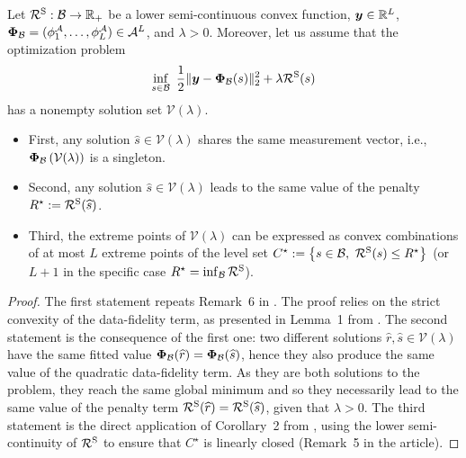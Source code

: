 \documentclass[12pt]{article}
\begin{document}
    \begin{proposition}
    \label{prop:abstract-rt}
    Let $\mathcal{R}^\mathrm{S}: \mathcal{B} \to \mathbb{R}_+$ be a lower semi-continuous convex function, $\bm{y}\in \mathbb{R}^L$, ${\bm{\Phi}_\mathcal{B}}= (\phi^\mathcal{A}_1 ,\ldots , \phi^\mathcal{A}_L) \in \mathcal{A}^L$, and $\lambda > 0$. Moreover, let us assume that the optimization problem
    \begin{equation} \label{eq:sparse-rt}
        \inf_{s \in \mathcal{B}}\ \frac{1}{2} \| \bm{y} - {\bm{\Phi}_\mathcal{B}}(s) \|_2^2 + \lambda \mathcal{R}^\mathrm{S}(s)
    \end{equation}
    has a nonempty solution set $\mathcal{V}(\lambda)$.
    \begin{itemize}
        \item First, any solution $\widehat{s} \in \mathcal{V}(\lambda)$ shares the same measurement vector, i.e., $\bm{\Phi}_\mathcal{B} \left(\mathcal{V}(\lambda)\right)$ is a singleton.
        \item Second, any solution $\widehat{s} \in \mathcal{V}(\lambda)$ leads to the same value of the penalty $R^\star := \mathcal{R}^\mathrm{S}(\widehat{s})$.
        \item Third, the extreme points of $\mathcal{V}(\lambda)$ can be expressed as convex combinations of at most $L$ extreme points of the level set $C^\star:= \left\{s \in \mathcal{B},\ \mathcal{R}^\mathrm{S}(s) \leq R^\star\right\}$ (or $L+1$ in the specific case $R^\star = \inf_{\mathcal{B}} \mathcal{R}^\mathrm{S}$). 
    \end{itemize}
    \end{proposition}

    \begin{proof}
        The first statement repeats Remark~6 in \cite{boyer2019representer}. The proof relies on the strict convexity of the data-fidelity term, as presented in Lemma~1 from \cite{tibshirani2013lasso}. The second statement is the consequence of the first one: two different solutions $\widehat{r}, \widehat{s} \in \mathcal{V}(\lambda)$ have the same fitted value $\bm{\Phi}_\mathcal{B}(\widehat{r}) = \bm{\Phi}_\mathcal{B}(\widehat{s})$, hence they also produce the same value of the quadratic data-fidelity term. As they are both solutions to the problem, they reach the same global minimum and so they necessarily lead to the same value of the penalty term $\mathcal{R}^\mathrm{S}(\widehat{r}) = \mathcal{R}^\mathrm{S}(\widehat{s})$, given that $\lambda > 0$. The third statement is the direct application of Corollary~2 from \cite{boyer2019representer}, using the lower semi-continuity of $\mathcal{R}^\mathrm{S}$ to ensure that $C^\star$ is linearly closed (Remark~5 in the article). 
    \end{proof}
\end{document}
